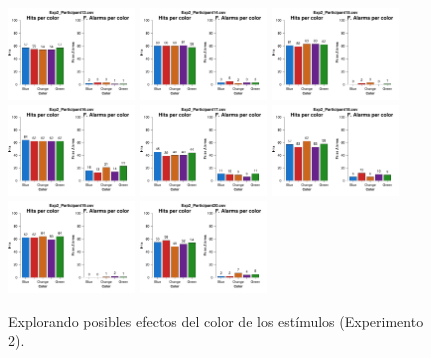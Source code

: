 \begin{figure}[th]
\includegraphics[width=0.30\textwidth]{Figures/Color_Exp2_P13} \includegraphics[width=0.30\textwidth]{Figures/Color_Exp2_P14} \includegraphics[width=0.30\textwidth]{Figures/Color_Exp2_P15}
\includegraphics[width=0.30\textwidth]{Figures/Color_Exp2_P16} \includegraphics[width=0.30\textwidth]{Figures/Color_Exp2_P17} \includegraphics[width=0.30\textwidth]{Figures/Color_Exp2_P18}
\includegraphics[width=0.30\textwidth]{Figures/Color_Exp2_P19} \includegraphics[width=0.30\textwidth]{Figures/Color_Exp2_P20} 
\caption[Color_Exp2]{Explorando posibles efectos del color de los estímulos (Experimento 2).}
\label{fig:Color_E2}
\end{figure}
